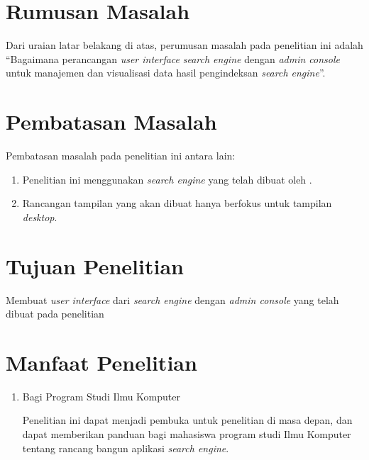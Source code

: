 \section{Rumusan Masalah}
Dari uraian latar belakang di atas, perumusan masalah pada penelitian ini adalah “Bagaimana perancangan \textit{user interface} \textit{search engine} dengan \textit{admin console} untuk manajemen dan visualisasi data hasil pengindeksan \textit{search engine}”.

\section{Pembatasan Masalah}
Pembatasan masalah pada penelitian ini antara lain:
\begin{enumerate}
	\item Penelitian ini menggunakan \textit{search engine} yang telah dibuat oleh \cite{lazu}.
	\item Rancangan tampilan yang akan dibuat hanya berfokus untuk tampilan \textit{desktop}.
\end{enumerate}

\section{Tujuan Penelitian}
Membuat \textit{user interface} dari \textit{search engine} dengan \textit{admin console} yang telah dibuat pada penelitian \cite{lazu}

\section{Manfaat Penelitian}
\begin{enumerate}
%	
	
	\item Bagi Program Studi Ilmu Komputer
	
	Penelitian ini dapat menjadi pembuka untuk penelitian di masa depan, dan dapat memberikan panduan bagi mahasiswa program studi Ilmu Komputer tentang rancang bangun aplikasi \textit{search engine}.
	
%	
	
\end{enumerate}



\begin{comment}

\end{comment}
